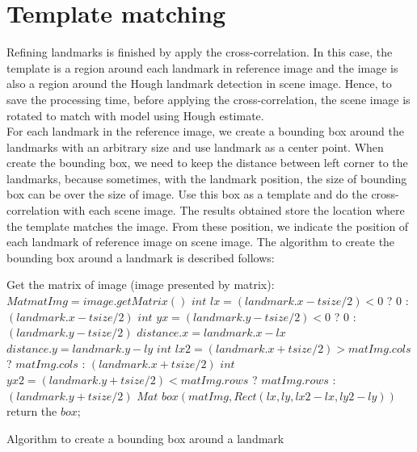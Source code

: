\section{Template matching}
Refining landmarks is finished by apply the cross-correlation. In this case, the template is a region around each landmark in reference image and the image is also a region around the Hough landmark detection in scene image. Hence, to save the processing time, before applying the cross-correlation, the scene image is rotated to match with model using Hough estimate.\\[0.2cm]
For each landmark in the reference image, we create a bounding box around the landmarks with an arbitrary size and use landmark as a center point. When create the bounding box, we need to keep the distance between left corner to the landmarks, because sometimes, with the landmark position, the size of bounding box can be over the size of image. Use this box as a template and do the cross-correlation with each scene image. The results obtained store the location where the template matches the image. From these position, we indicate the position of each landmark of reference image on scene image. The algorithm to create the bounding box around a landmark is described follows:\\[0.2cm]
\begin{algorithm}[H]
\Indm 
\SetAlgoLined
{}
\Indp
Get the matrix of image (image presented by matrix): $Mat matImg = image.getMatrix()$\;
$int$ $lx = (landmark.x - tsize/2) < 0$ ? $0$ : $(landmark.x - tsize/2)$\;
$int$ $yx = (landmark.y - tsize/2) < 0$ ? $0$ : $(landmark.y - tsize/2)$\;
$distance.x = landmark.x - lx$\;
$distance.y = landmark.y - ly$\;
$int$ $lx2 = (landmark.x + tsize/2) > matImg.cols$ ? $matImg.cols$ : $(landmark.x + tsize/2)$\;
$int$ $yx2 = (landmark.y + tsize/2) < matImg.rows$ ? $matImg.rows$ : $(landmark.y + tsize/2)$\;
$Mat$ $box(matImg,Rect(lx,ly,lx2 - lx, ly2 - ly))$\;
return the $box$;
\caption{Algorithm to create a bounding box around a landmark}
\end{algorithm}~\\[0.2cm]
